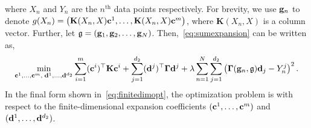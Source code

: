 where $X_n$ and $Y_n$ are the $n^{\text{th}}$ data points respectively. For brevity, we use $\mathbf{g}_n$ to denote $g(X_n) = \left(\mathbf{K}(X_n, X) \mathbf{c}^1, \dots, \mathbf{K}(X_n, X) \mathbf{c}^m \right)$, where $\mathbf{K}(X_n, X)$ is a column vector. Further, let $\mathfrak{g} = (\mathbf{g}_1, \mathbf{g}_2, \dots, \mathbf{g}_N)$. Then,~\eqref{eq:sumexpansion} can be written as,
\begin{align}
\min_{\mathbf{c}^1,\ldots,\mathbf{c}^m,\; \mathbf{d}^1,\ldots,\mathbf{d}^{d_2}} 
\sum_{i=1}^m (\mathbf{c}^i)^\top \mathbf{K} \mathbf{c}^i
+ \sum_{j=1}^{d_2} (\mathbf{d}^j)^\top \mathbf{\Gamma} \mathbf{d}^j
+ \lambda \sum\limits_{n=1}^N \sum\limits_{j=1}^{d_2} \left( \mathbf{\Gamma}(\mathbf{g}_n, \mathfrak{g}) \mathbf{d}_j - Y^j_n \right)^2. \label{eq:finitedimopt}
\end{align}
In the final form shown in~\eqref{eq:finitedimopt}, the optimization problem is with respect to the finite-dimensional expansion coefficients $(\mathbf{c}^1, \dots, \mathbf{c}^m)$ and $(\mathbf{d}^1, \dots, \mathbf{d}^{d_2})$.
\pagebreak
